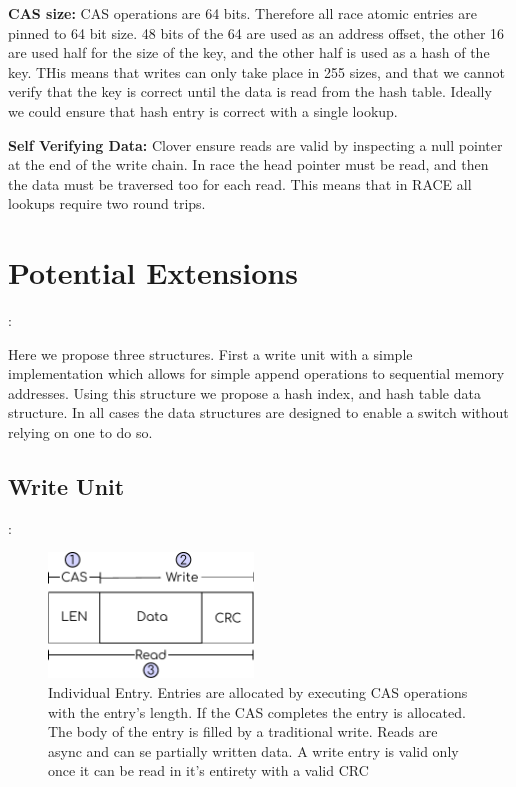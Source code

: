 \textbf{CAS size:} CAS operations are 64 bits. Therefore all race atomic entries
are pinned to 64 bit size. 48 bits of the 64 are used as an address offset, the
other 16 are used half for the size of the key, and the other half is used as a
hash of the key. THis means that writes can only take place in 255 sizes, and
that we cannot verify that the key is correct until the data is read from the
hash table. Ideally we could ensure that hash entry is correct with a single lookup.

\textbf{Self Verifying Data:} Clover ensure reads are valid by inspecting a null
pointer at the end of the write chain. In race the head pointer must be read,
and then the data must be traversed too for each read. This means that in RACE
all lookups require two round trips.

\section{Potential Extensions}:

Here we propose three structures. First a write unit with a simple
implementation which allows for simple append operations to sequential memory
addresses. Using this structure we propose a hash index, and hash table data
structure. In all cases the data structures are designed to enable a switch
without relying on one to do so.

\subsection{Write Unit}:

\begin{figure}[t] \includegraphics[width=0.485\textwidth]{fig/WriteBufEntry.pdf}
\caption{Individual Entry. Entries are allocated by executing CAS operations
with the entry's length. If the CAS completes the entry is allocated. The body
of the entry is filled by a traditional write. Reads are async and can se
partially written data. A write entry is valid only once it can be read in it's
entirety with a valid CRC}

\label{fig:write_unit}
\end{figure}

